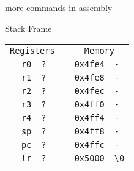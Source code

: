 




\begin{frame}{more commands in assembly}


    
    
    \end{frame}

    




\begin{frame}{Stack Frame}
    \begin{alltt}
        \begin{tabular}{ r | l p{5mm} r | l }
            \multicolumn{2}{c}{Registers} && \multicolumn{2}{c}{Memory} \\
            r0 & ? && 0x4fe4 & - \\
            r1 & ? && 0x4fe8 & - \\
            r2 & ? && 0x4fec & - \\
            r3 & ? && 0x4ff0 & - \\
            r4 & ? && 0x4ff4 & - \\
            sp & ? && 0x4ff8 & - \\
            pc & ? && 0x4ffc & - \\
            lr & ? && 0x5000 & {\textbackslash}0 \\
            \end{tabular}
        \end{alltt}
    \end{frame}

